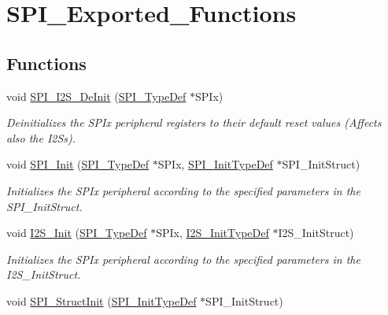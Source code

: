 \hypertarget{group___s_p_i___exported___functions}{}\section{S\+P\+I\+\_\+\+Exported\+\_\+\+Functions}
\label{group___s_p_i___exported___functions}
\subsection*{Functions}
\begin{DoxyCompactItemize}
\item 
void \mbox{\hyperlink{group___s_p_i___exported___functions_gabe36880945fa56785283a9c0092124cc}{S\+P\+I\+\_\+\+I2\+S\+\_\+\+De\+Init}} (\mbox{\hyperlink{struct_s_p_i___type_def}{S\+P\+I\+\_\+\+Type\+Def}} $\ast$S\+P\+Ix)
\begin{DoxyCompactList}\small\item\em Deinitializes the S\+P\+Ix peripheral registers to their default reset values (Affects also the I2\+Ss). \end{DoxyCompactList}\item 
void \mbox{\hyperlink{group___s_p_i___exported___functions_ga8dacc1dc48bf08c0f12da409f4889037}{S\+P\+I\+\_\+\+Init}} (\mbox{\hyperlink{struct_s_p_i___type_def}{S\+P\+I\+\_\+\+Type\+Def}} $\ast$S\+P\+Ix, \mbox{\hyperlink{struct_s_p_i___init_type_def}{S\+P\+I\+\_\+\+Init\+Type\+Def}} $\ast$S\+P\+I\+\_\+\+Init\+Struct)
\begin{DoxyCompactList}\small\item\em Initializes the S\+P\+Ix peripheral according to the specified parameters in the S\+P\+I\+\_\+\+Init\+Struct. \end{DoxyCompactList}\item 
void \mbox{\hyperlink{group___s_p_i___exported___functions_ga53661884ae4a9640df7cbc59187782f7}{I2\+S\+\_\+\+Init}} (\mbox{\hyperlink{struct_s_p_i___type_def}{S\+P\+I\+\_\+\+Type\+Def}} $\ast$S\+P\+Ix, \mbox{\hyperlink{struct_i2_s___init_type_def}{I2\+S\+\_\+\+Init\+Type\+Def}} $\ast$I2\+S\+\_\+\+Init\+Struct)
\begin{DoxyCompactList}\small\item\em Initializes the S\+P\+Ix peripheral according to the specified parameters in the I2\+S\+\_\+\+Init\+Struct. \end{DoxyCompactList}\item 
void \mbox{\hyperlink{group___s_p_i___exported___functions_ga9a0116f88cc2c4478c270f05608703f1}{S\+P\+I\+\_\+\+Struct\+Init}} (\mbox{\hyperlink{struct_s_p_i___init_type_def}{S\+P\+I\+\_\+\+Init\+Type\+Def}} $\ast$S\+P\+I\+\_\+\+Init\+Struct)

\end{DoxyCompactItemize}
